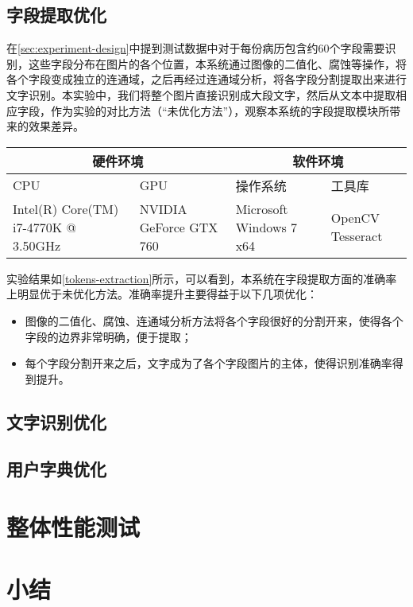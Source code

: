 \subsection{字段提取优化}
在\autoref{sec:experiment-design}中提到测试数据中对于每份病历包含约60个字段需要识别，这些字段分布在图片的各个位置，本系统通过图像的二值化、腐蚀等操作，将各个字段变成独立的连通域，之后再经过连通域分析，将各字段分割提取出来进行文字识别。本实验中，我们将整个图片直接识别成大段文字，然后从文本中提取相应字段，作为实验的对比方法（“未优化方法”），观察本系统的字段提取模块所带来的效果差异。
\begin{table}[!htbp]
	\label{tokens-extraction}
	\centering
	\vspace{10pt}
  \renewcommand\arraystretch{1.5}  %
	\begin{tabular}{p{3cm}|p{3cm}|p{3cm}|p{3cm}}
    \hline
    \multicolumn{2}{c|}{硬件环境} & \multicolumn{2}{c}{软件环境} \\
		\hline
    CPU&GPU&操作系统&工具库 \\
		\hline
    Intel(R) Core(TM)  i7-4770K @ 3.50GHz & NVIDIA GeForce  GTX 760 & Microsoft  Windows 7 x64 & OpenCV  Tesseract \\
    \hline
	\end{tabular}
\end{table}

实验结果如\autoref{tokens-extraction}所示，可以看到，本系统在字段提取方面的准确率上明显优于未优化方法。准确率提升主要得益于以下几项优化：
\begin{itemize}
  \item 图像的二值化、腐蚀、连通域分析方法将各个字段很好的分割开来，使得各个字段的边界非常明确，便于提取；
  \item 每个字段分割开来之后，文字成为了各个字段图片的主体，使得识别准确率得到提升。
\end{itemize}

\subsection{文字识别优化}


\subsection{用户字典优化}
\section{整体性能测试}

\section{小结}
